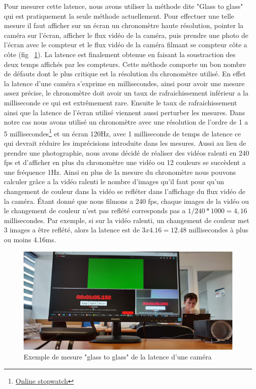 Pour mesurer cette latence, nous avons utiliser la méthode dite "Glass to glass" qui est pratiquement la seule méthode actuellement. Pour effectuer une telle mesure il faut afficher sur un écran un chronomètre haute résolution, pointer la caméra sur l'écran, afficher le flux vidéo de la caméra, puis prendre une photo de l'écran avec le compteur et le flux vidéo de la caméra filmant se compteur côte a côte (fig ~\ref{fig:latency:glasstoglass}). La latence est finalement obtenue en faisant la soustraction des deux temps affichés par les compteurs. Cette méthode comporte un bon nombre de défauts dont le plus critique est la résolution du chronomètre utilisé. En effet la latence d'une caméra s'exprime en millisecondes, ainsi pour avoir une mesure assez précise, le chronomètre doit avoir un taux de rafraichissement inférieur a la milliseconde ce qui est extrêmement rare. Ensuite le taux de rafraichissement ainsi que la latence de l'écran utilisé viennent aussi perturber les mesures. Dans notre cas nous avons utilisé un chronomètre avec une résolution de l'ordre de 1 a 5 millisecondes\footnote{\href{https://stopwatch.onlineclock.net/}{Online stopwatch}} et un écran 120Hz, avec 1 milliseconde de temps de latence ce qui devrait réduire les imprécisions introduite dans les mesures. Aussi au lieu de prendre une photographie, nous avons décidé de réaliser des vidéos ralenti en 240 fps et d'afficher en plus du chronomètre une vidéo ou 12 couleurs se succèdent a une fréquence 1Hz. Ainsi en plus de la mesure du chronomètre nous pouvons calculer grâce a la vidéo ralenti le nombre d'images qu'il faut pour qu'un changement de couleur dans la vidéo se refléter dans l'affichage du flux vidéo de la caméra. Étant donné que nous filmons a 240 fps, chaque images de la vidéo ou le changement de couleur n'est pas reflété corresponds pas a $1/240 * 1000 = 4,16$ millisecondes. Par exemple, si sur la vidéo ralenti, un changement de couleur met 3 images a être reflété, alors la latence est de $3 x 4.16 = 12.48$ millisecondes à plus ou moins 4.16ms.

\begin{figure}[H]
\centering
\includegraphics[width=\linewidth]{images/glasstoglass}
\caption{Exemple de mesure "glass to glass" de la latence d'une caméra}
\label{fig:latency:glasstoglass}
\end{figure}

